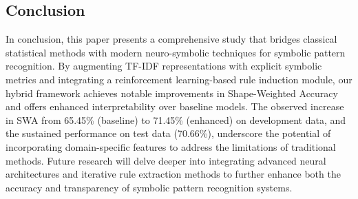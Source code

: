 \documentclass{article}
\begin{document}
\subsection{Conclusion}
In conclusion, this paper presents a comprehensive study that bridges classical statistical methods with modern neuro-symbolic techniques for symbolic pattern recognition. By augmenting TF-IDF representations with explicit symbolic metrics and integrating a reinforcement learning-based rule induction module, our hybrid framework achieves notable improvements in Shape-Weighted Accuracy and offers enhanced interpretability over baseline models. The observed increase in SWA from 65.45\% (baseline) to 71.45\% (enhanced) on development data, and the sustained performance on test data (70.66\%), underscore the potential of incorporating domain-specific features to address the limitations of traditional methods. Future research will delve deeper into integrating advanced neural architectures and iterative rule extraction methods to further enhance both the accuracy and transparency of symbolic pattern recognition systems.
\end{document}
